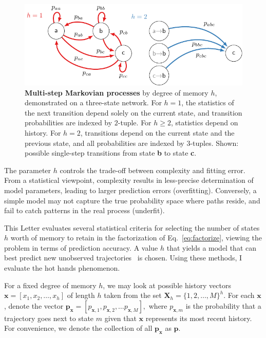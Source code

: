 \documentclass[prl,twocolumn,groupedaddress]{revtex4-1}
\newcommand{\bx}{\mathbf{x}}
\newcommand{\bp}{\mathbf{p}}
\renewcommand{\bf}[1]{\textbf{#1}}
\begin{document}
  \begin{figure}
 \includegraphics[width=\linewidth]{fig1b}
 \caption{\bf{Multi-step Markovian processes}  by degree of memory $h$, demonstrated on a three-state network. For $h=1$, the statistics of the next transition depend solely on the current state, and transition probabilities are indexed by  $2$-tuple. For $h\geq2$, statistics depend on history. For $h=2$, transitions depend on the
 current state and the previous state, and all probabilities are indexed by $3$-tuples.  Shown:  possible single-step transitions from state \bf{b} to state \bf{c}.  } \label{fig:fig1}
 \end{figure}

The parameter $h$ controls the trade-off between complexity and fitting error. From a statistical viewpoint, complexity results in less-precise determination of model parameters, leading to larger prediction errors (overfitting). Conversely, a simple model may not capture the true probability space where paths reside, and fail to catch patterns in the real process (underfit).

This Letter evaluates several statistical criteria for selecting the number of states $h$ worth of memory to retain in the factorization of Eq.~\ref{eq:factorize}, viewing the problem in terms of prediction accuracy. 
A value $h$ that yields a model that can best predict new unobserved trajectories~\cite{claeskens2008model} is chosen. Using these methods, I evaluate the hot hands phenomenon.

 For a fixed degree of memory $h$,
we may look at possible history vectors $\bx = [x_1,x_2,\ldots,x_h]$ of length $h$ taken from the set $\mathbf{X}_h = \{1,2,\ldots,M \}^h$. For each $\bx$, denote the vector $\mathbf{p}_{\bx} = [p_{\bx,1},p_{\bx,2},\ldots{p}_{\bx,M}],$ where $p_{\bx,m}$ is the probability that a trajectory goes next to state $m$ given that $\bx$ represents its most recent history. For convenience, we denote the collection of all $\bp_\bx$ as $\mathbf{p}$.  
\end{document}
